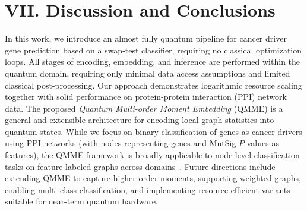 \documentclass[
  reprint,
  superscriptaddress,
  amsmath,amssymb,
  aps,prl,
]{revtex4-2}
\begin{document}
\section{VII. Discussion and Conclusions}
%
%
%
\noindent In this work, we introduce an almost fully quantum pipeline for cancer driver gene prediction based on a swap-test classifier, requiring no classical optimization loops. All stages of encoding, embedding, and inference are performed within the quantum domain, requiring only minimal data access assumptions and limited classical post-processing. Our approach demonstrates logarithmic resource scaling together with solid performance on protein-protein interaction (PPI) network data.
%
The proposed \textit{Quantum Multi-order Moment Embedding} (QMME) is a general and extensible architecture for encoding local graph statistics into quantum states. While we focus on binary classification of genes as cancer drivers using PPI networks (with nodes representing genes and MutSig \(P\)-values as features), the QMME framework is broadly applicable to node-level classification tasks on feature-labeled graphs across domains~\cite{bi2023mm}. 
%
Future directions include extending QMME to capture higher-order moments, supporting weighted graphs, enabling multi-class classification, and implementing resource-efficient variants suitable for near-term quantum hardware.
%

\nocite{*}




\clearpage
\onecolumngrid
\appendix
\end{document}
